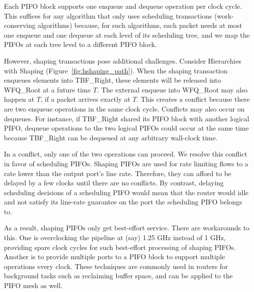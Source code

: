 Each PIFO block supports one enqueue and dequeue operation per clock cycle.
This suffices for any algorithm that only uses scheduling transactions
(work-conserving algorithms) because, for such algorithms, each packet needs at
most one enqueue and one dequeue at each level of its scheduling tree, and we
map the PIFOs at each tree level to a different PIFO block.

However, shaping transactions pose additional challenges. Consider Hierarchies
with Shaping (Figure~\ref{fig:hshaping_path}). When the shaping transaction
enqueues elements into TBF\_Right, these elements will be released into
WFQ\_Root at a future time $T$. The external enqueue into WFQ\_Root may also
happen at $T$, if a packet arrives exactly at $T$. This creates a conflict
because there are two enqueue operations in the same clock cycle.  Conflicts may also
occur on dequeues.  For instance, if TBF\_Right shared its PIFO block with
another logical PIFO, dequeue operations to the two logical PIFOs could occur
at the same time because TBF\_Right can be dequeued at any arbitrary wall-clock
time.


In a conflict, only one of the two operations can proceed. We resolve this
conflict in favor of scheduling PIFOs. Shaping PIFOs are used for rate limiting
flows to a rate lower than the output port's line rate. Therefore, they can afford to be delayed by
a few clocks until there are no conflicts. By contrast, delaying scheduling
decisions of a scheduling PIFO would mean that the router would idle and not
satisfy its line-rate guarantee on the port the scheduling PIFO belongs to.

As a result, shaping PIFOs only get best-effort service. There are workarounds
to this. One is overclocking the pipeline at (say) 1.25 GHz instead of 1 GHz,
providing spare clock cycles for such best-effort processing of shaping PIFOs.
Another is to provide multiple ports to a PIFO block to support multiple
operations every clock.  These techniques are commonly used in routers for
background tasks such as reclaiming buffer space, and can be applied to the
PIFO mesh as well.
